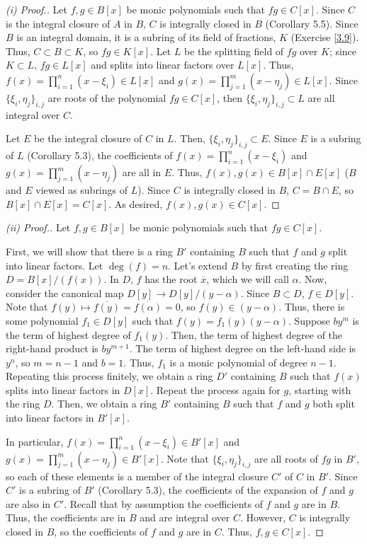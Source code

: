 \begin{proof}[(i) Proof.]
Let $f,g \in B[x]$ be monic polynomials such that $fg \in C[x]$. Since $C$ is the integral closure of $A$ in $B$, $C$ is integrally closed in $B$ 
(Corollary 5.5). Since $B$ is an integral domain, it is a subring of its field of fractions, $K$ (Exercise \ref{3.9}). Thus, $C \subset B \subset K$,
so $fg \in K[x]$. Let $L$ be the splitting field of $fg$ over $K$; since $K \subset L$, $fg \in L[x]$ and splits into linear factors over $L[x]$. Thus,
$f(x) = \prod_{i=1}^n(x - \xi_i) \in L[x]$ and $g(x) = \prod_{j=1}^m(x - \eta_j) \in L[x]$. Since $\{\xi_i,\eta_j\}_{i,j}$ are roots of the polynomial
$fg \in C[x]$, then $\{\xi_i, \eta_j\}_{i,j} \subset L$ are all integral over $C$.

Let $E$ be the integral closure of $C$ in $L$. Then, $\{\xi_i, \eta_j\}_{i,j} \subset E$. Since $E$ is a subring of $L$ (Corollary 5.3), the coefficients of
$f(x) = \prod_{i=1}^n(x - \xi_i)$ and $g(x) = \prod_{j=1}^m(x - \eta_j)$ are all in $E$. Thus, $f(x),g(x) \in B[x] \cap E[x]$ ($B$ and $E$ viewed as 
subrings of $L$). Since $C$ is integrally closed in $B$, $C = B \cap E$, so $B[x] \cap E[x] = C[x]$. As desired, $f(x),g(x) \in C[x]$.
\end{proof}

\begin{proof}[(ii) Proof.]
Let $f,g \in B[x]$ be monic polynomials such that $fg \in C[x]$.

First, we will show that there is a ring $B'$ containing $B$ such that $f$ and $g$ split into linear factors. Let $\deg(f) = n$. Let's extend $B$
by first creating the ring $D = B[x]/(f(x))$. In $D$, $f$ has the root $\overline{x}$, which we will call $\alpha$. Now, consider the canonical map
$D[y] \to D[y]/(y - \alpha)$. Since $B \subset D$, $f \in D[y]$. Note that $f(y) \mapsto \overline{f(y)} = \overline{f(\alpha)} = 0$, so 
$f(y) \in (y - \alpha)$. Thus, there is some polynomial $f_1 \in D[y]$ such that $f(y) = f_1(y)(y - \alpha)$. Suppose $b y^m$ is the term of highest
degree of $f_1(y)$. Then, the term of highest degree of the right-hand product is $b y^{m+1}$. The term of highest degree on the left-hand side is $y^n$,
so $m = n-1$ and $b = 1$. Thus, $f_1$ is a monic polynomial of degree $n - 1$. Repeating this process finitely, we obtain a ring $D'$ containing $B$ such
that $f(x)$ splits into linear factors in $D[x]$. Repeat the process again for $g$, starting with the ring $D$. Then, we obtain a ring $B'$ containing $B$
such that $f$ and $g$ both split into linear factors in $B'[x]$.

In particular, $f(x) = \prod_{i=1}^n(x - \xi_i) \in B'[x]$ and $g(x) = \prod_{j=1}^m(x - \eta_j) \in B'[x]$. Note that $\{\xi_i,\eta_j\}_{i,j}$ are all
roots of $fg$ in $B'$, so each of these elements is a member of the integral closure $C'$ of $C$ in $B'$. Since $C'$ is a subring of $B'$ (Corollary 5.3),
the coefficients of the expansion of $f$ and $g$ are also in $C'$. Recall that by assumption the coefficients of $f$ and $g$ are in $B$. Thus, the coefficients
are in $B$ and are integral over $C$. However, $C$ is integrally closed in $B$, so the coefficients of $f$ and $g$ are in $C$. Thus, $f,g \in C[x]$.
\end{proof}

